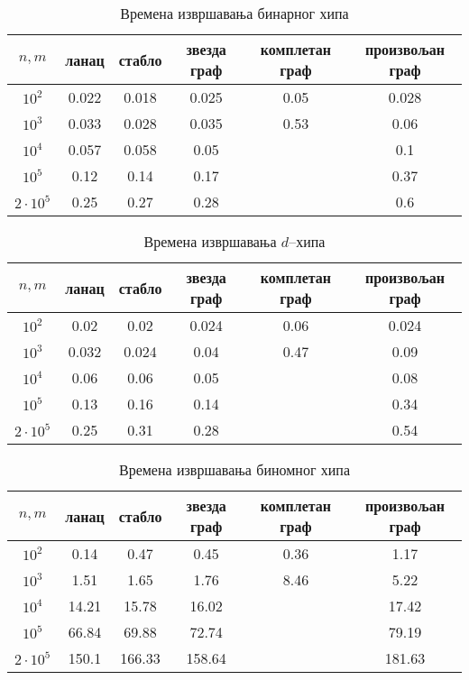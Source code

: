 \documentclass[11pt, a4paper]{article}
\theoremstyle{remark}
\numberwithin{equation}{section}
\begin{document}
	\begin{center}
		\begin{table}[H]
			\centering
			\caption{Времена извршавања бинарног хипа}
			\begin{tabular}{cccccc} \toprule
				$n, m$ & ланац & стабло & звезда граф & комплетан граф & произвољан граф\\ \midrule
				$10^2$ & 0.022 & 0.018 & 0.025 & 0.05 & 0.028\\ 
				$10^3$ & 0.033 & 0.028 & 0.035 & 0.53 & 0.06\\
				$10^4$ & 0.057 & 0.058 & 0.05 & & 0.1\\
				$10^5$ & 0.12 & 0.14 & 0.17 & & 0.37\\
				$2\cdot 10^5$ & 0.25 & 0.27 & 0.28 & & 0.6\\
				\bottomrule
			\end{tabular}
		\end{table}
	\end{center}
	\begin{center}
	\begin{table}[H]
		\centering
		\caption{Времена извршавања $d$--хипа}
		\begin{tabular}{cccccc} \toprule
			$n, m$ & ланац & стабло & звезда граф & комплетан граф & произвољан граф\\ \midrule
			$10^2$ & 0.02 & 0.02 & 0.024 & 0.06 & 0.024 \\ 
			$10^3$ & 0.032 & 0.024 & 0.04 & 0.47 & 0.09 \\
			$10^4$ & 0.06 & 0.06 & 0.05 & & 0.08\\
			$10^5$ & 0.13 & 0.16 & 0.14 & & 0.34\\
			$2\cdot 10^5$ & 0.25 & 0.31 & 0.28 & & 0.54\\
			\bottomrule
		\end{tabular}
	\end{table}
	\end{center}
	\begin{center}
	\begin{table}[H]
		\centering
		\caption{Времена извршавања биномног хипа}
		\begin{tabular}{cccccc} \toprule
			$n, m$ & ланац & стабло & звезда граф & комплетан граф & произвољан граф\\ \midrule
			$10^2$ & 0.14 & 0.47 & 0.45 & 0.36 & 1.17\\ 
			$10^3$ & 1.51 & 1.65 & 1.76 & 8.46 & 5.22\\
			$10^4$ & 14.21 & 15.78 & 16.02 & & 17.42\\
			$10^5$ & 66.84 & 69.88 & 72.74 & & 79.19\\
			$2\cdot 10^5$ & 150.1 & 166.33 & 158.64 & & 181.63\\
			\bottomrule
		\end{tabular}
	\end{table}
	\end{center}
\end{document}
